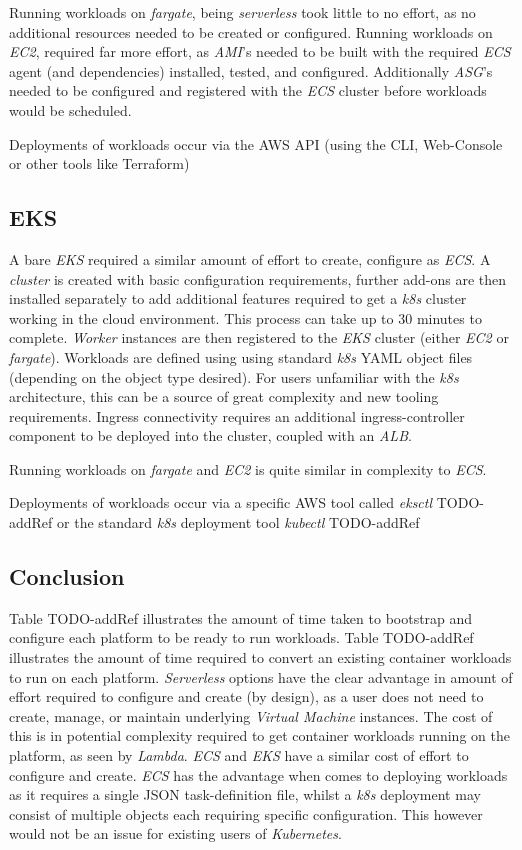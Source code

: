 Running workloads on \textit{fargate}, being \textit{serverless} took little to no effort, as no additional resources needed to be created or configured.
Running workloads on \textit{EC2}, required far more effort, as \textit{AMI}'s needed to be built with the required \textit{ECS} agent (and dependencies) installed, tested,
and configured. Additionally \textit{ASG}'s needed to be configured and registered with the \textit{ECS} cluster before workloads would be scheduled.

Deployments of workloads occur via the AWS API (using the CLI, Web-Console or other tools like Terraform)

\subsection{EKS}
A bare \textit{EKS} required a similar amount of effort to create, configure as \textit{ECS}. A \emph{cluster} is created with basic configuration requirements,
further add-ons are then installed separately to add additional features required to get a \textit{k8s} cluster working in the cloud environment.
This process can take up to 30 minutes to complete.
\textit{Worker} instances are then registered to the \textit{EKS} cluster (either \textit{EC2} or \textit{fargate}).
Workloads are defined using using standard \textit{k8s} YAML object files (depending on the object type desired).
For users unfamiliar with the \textit{k8s} architecture, this can be a source of great complexity and new tooling requirements.
Ingress connectivity requires an additional ingress-controller component to be deployed into the cluster, coupled with an \textit{ALB}.

Running workloads on \textit{fargate} and \textit{EC2} is quite similar in complexity to \textit{ECS}.

Deployments of workloads occur via a specific AWS tool called \emph{eksctl} TODO-addRef or the standard \textit{k8s} deployment tool \emph{kubectl} TODO-addRef

\subsection*{Conclusion}
Table TODO-addRef illustrates the amount of time taken to bootstrap and configure each platform to be ready to run workloads.
Table TODO-addRef illustrates the amount of time required to convert an existing container workloads to run on each platform.
\textit{Serverless} options have the clear advantage in amount of effort required to configure and create (by design), as a user does not need to
create, manage, or maintain underlying \textit{Virtual Machine} instances. The cost of this is in potential complexity required to get container workloads running on the
platform, as seen by \textit{Lambda}.
\textit{ECS} and \textit{EKS} have a similar cost of effort to configure and create. \textit{ECS} has the advantage when comes to deploying workloads as it requires a
single JSON task-definition file, whilst a \textit{k8s} deployment may consist of multiple objects each requiring specific configuration.
This however would not be an issue for existing users of \textit{Kubernetes}.


